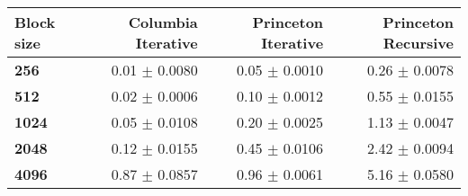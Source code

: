\begin{tabular}{lrrr}\toprule
\textbf{Block size}  & \textbf{Columbia Iterative} & \textbf{Princeton Iterative} & \textbf{Princeton Recursive}\\\midrule
\textbf{256}  & 0.01 $\pm$ 0.0080 & 0.05 $\pm$ 0.0010 & 0.26 $\pm$ 0.0078\\
\textbf{512}  & 0.02 $\pm$ 0.0006 & 0.10 $\pm$ 0.0012 & 0.55 $\pm$ 0.0155\\
\textbf{1024}  & 0.05 $\pm$ 0.0108 & 0.20 $\pm$ 0.0025 & 1.13 $\pm$ 0.0047\\
\textbf{2048}  & 0.12 $\pm$ 0.0155 & 0.45 $\pm$ 0.0106 & 2.42 $\pm$ 0.0094\\
\textbf{4096} & 0.87 $\pm$ 0.0857 & 0.96 $\pm$ 0.0061 & 5.16 $\pm$ 0.0580\\
\bottomrule
\end{tabular}
